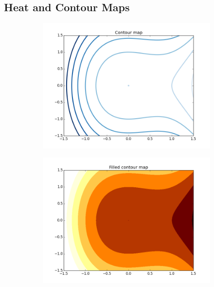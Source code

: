 
\subsection*{Heat and Contour Maps} %

\begin{figure}[h]
\centering
\begin{subfigure}{.45\textwidth}
\centering
\includegraphics[width=\textwidth]{contour_map.png}
\end{subfigure}
\begin{subfigure}{.45\textwidth}
\centering
\includegraphics[width=\textwidth]{contour_map_filled.png}

\end{subfigure}
\end{figure}
